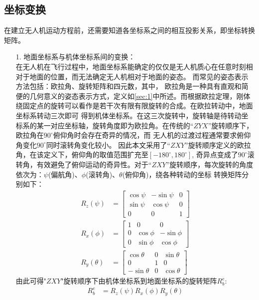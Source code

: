 \subsection{坐标变换}
在建立无人机运动方程前，还需要知道各坐标系之间的相互投影关系，即坐标转换矩阵。
\begin{itemize}
\item [1.] 地面坐标系与机体坐标系间的变换：\\
在无人机在飞行过程中，地面坐标系能确定的仅仅是无人机质心在任意时刻相对于地面的位置，而无法确定无人机相对于地面的姿态。
而常见的姿态表示方法包括：欧拉角、旋转矩阵和四元数，其中，
欧拉角是一种具有直观和简便的几何意义的姿态表示方式，定义如\autoref{sec:1}中所述。而根据欧拉定理，刚体绕固定点的旋转可以看作是若干次有限有限旋转的合成。在欧拉转动中，地面坐标系转动三次即可
得到机体坐标系。在这三次旋转中，旋转轴是待转动坐标系的某一对应坐标轴，旋转角度即为欧拉角。在传统的“$ZYX$”旋转顺序下，欧拉角在$90^\circ$俯仰角时会存在奇异的情况，而
无人机的过渡过程通常要求俯仰角变化$90^\circ$同时滚转角变化较小。
因此本文采用了“$ZXY$”旋转顺序定义的欧拉角，在该定义下，俯仰角的取值范围扩充至$\left [ -180^\circ,180^\circ \right ]$,
奇异点变成了$90^\circ$滚转角，有效避免了俯仰运动的奇异性。对于“$ZXY$”旋转顺序，每次旋转的角度依次为：$\psi$(偏航角)、$\phi$(滚转角)、$\theta$(俯仰角)，绕各种转动的坐标
转换矩阵分别如下：
\begin{align}
    R_{z}(\psi) & = \begin{bmatrix}
      \cos\psi&  -\sin\psi& 0\\
      \sin\psi&  \cos\psi& 0\\
      0&  0& 1
    \end{bmatrix}\\
    R_{x}(\phi) & = \begin{bmatrix}
      1&  0& 0\\
      0&  \cos\phi& -\sin\phi\\
      0&  \sin\phi& \cos\phi
    \end{bmatrix}\\
    R_{y}(\theta) & = \begin{bmatrix}
      \cos\theta&  0& \sin\theta\\
      0&  1& 0\\
      -\sin\theta&  0& \cos\theta
    \end{bmatrix}
\end{align}
由此可得"$ZXY$"旋转顺序下由机体坐标系到地面坐标系的旋转矩阵$R_{b}^{e}$:
\begin{align}
    R_{b}^{e} &= R_{z}(\psi)R_{x}(\phi)R_{y}(\theta) \nonumber \\

\end{align}
\end{itemize}
